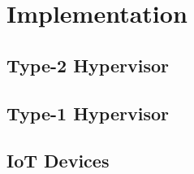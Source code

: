 \chapter{Implementation}\label{chapter:implementation}
\section{Type-2 Hypervisor}
\section{Type-1 Hypervisor}
\section{IoT Devices}
